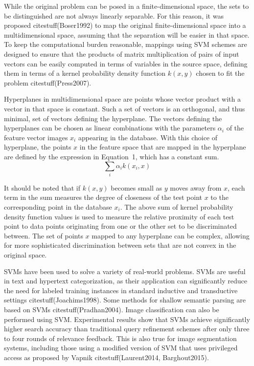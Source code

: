 \documentclass[preprint,12pt]{elsarticle}
\begin{document}
While the original problem can be posed in a finite-dimensional space, the sets to be distinguished are not always linearly separable. For this reason, it was proposed citestuff(Boser1992) to map the original finite-dimensional space into a multidimensional space, assuming that the separation will be easier in that space. To keep the computational burden reasonable, mappings using SVM schemes are designed to ensure that the products of matrix multiplication of pairs of input vectors can be easily computed in terms of variables in the source space, defining them in terms of a kernel probability density function $k(x, y)$ chosen to fit the problem citestuff(Press2007).

Hyperplanes in multidimensional space are points whose vector product with a vector in that space is constant. Such a set of vectors is an orthogonal, and thus minimal, set of vectors defining the hyperplane. The vectors defining the hyperplanes can be chosen as linear combinations with the parameters $\alpha_{i}$ of the feature vector images $x_{i}$ appearing in the database. With this choice of hyperplane, the points $x$ in the feature space that are mapped in the hyperplane are defined by the expression 
in Equation~1, which has a constant sum.
\begin{equation}
	\sum_{i} \alpha_{i}k(x_{i},x)
	\label{eqn:1}
\end{equation}

It should be noted that if $k(x, y)$ becomes small as $y$ moves away from $x$, each term in the sum measures the degree of closeness of the test point $x$ to the corresponding point in the database $x_{i}$. The above sum of kernel probability density function values is used to measure the relative proximity of each test point to data points originating from one or the other set to be discriminated between. The set of points $x$ mapped to any hyperplane can be complex, allowing for more sophisticated discrimination between sets that are not convex in the original space.

SVMs have been used to solve a variety of real-world problems. SVMs are useful in text and hypertext categorization, as their application can significantly reduce the need for labeled training instances in standard inductive and transductive settings citestuff(Joachims1998). Some methods for shallow semantic parsing are based on SVMs citestuff(Pradhan2004). Image classification can also be performed using SVM. Experimental results show that SVMs achieve significantly higher search accuracy than traditional query refinement schemes after only three to four rounds of relevance feedback. This is also true for image segmentation systems, including those using a modified version of SVM that uses privileged access as proposed by Vapnik citestuff(Laurent2014, Barghout2015).
\end{document}
